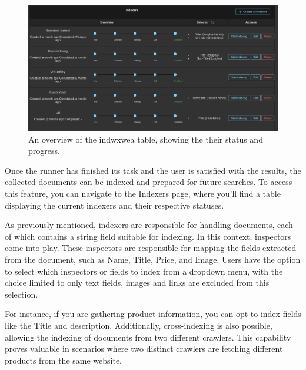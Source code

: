 \begin{figure}[h]	
     \centering
     \includegraphics[width=13cm]{figures/demo-10.png}
     \caption{An overview of the indwxwea table, showing the their status and progress.}
     \label{fig:indexers-overview}
\end{figure}

Once the runner has finished its task and the user is satisfied with the results, the collected documents can be indexed and prepared for future searches. To access this feature, you can navigate to the Indexers page, where you'll find a table displaying the current indexers and their respective statuses.

As previously mentioned, indexers are responsible for handling documents, each of which contains a string field suitable for indexing. In this context, inspectors come into play. These inspectors are responsible for mapping the fields extracted from the document, such as Name, Title, Price, and Image. Users have the option to select which inspectors or fields to index from a dropdown menu, with the choice limited to only text fields, images and links are excluded from this selection.

For instance, if you are gathering product information, you can opt to index fields like the Title and description. Additionally, cross-indexing is also possible, allowing the indexing of documents from two different crawlers. This capability proves valuable in scenarios where two distinct crawlers are fetching different products from the same website.

